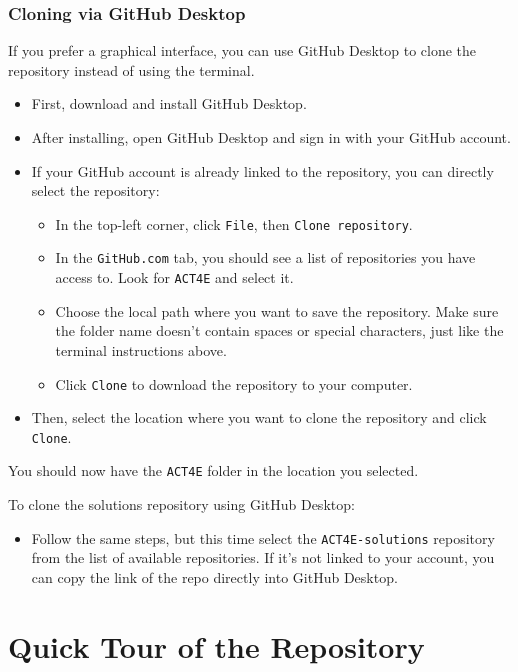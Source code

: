 \documentclass{article}
\begin{document}
\subsubsection{Cloning via GitHub Desktop}
If you prefer a graphical interface, you can use GitHub Desktop to clone the repository instead of using the terminal. 
\begin{itemize} 
\item First, download and install GitHub Desktop. 
\item After installing, open GitHub Desktop and sign in with your GitHub account. 
\item If your GitHub account is already linked to the repository, you can directly select the repository: \begin{itemize} 
\item In the top-left corner, click \texttt{File}, then \texttt{Clone repository}. 
\item In the \texttt{GitHub.com} tab, you should see a list of repositories you have access to. Look for \texttt{ACT4E} and select it. 
\item Choose the local path where you want to save the repository. Make sure the folder name doesn't contain spaces or special characters, just like the terminal instructions above. 
\item Click \texttt{Clone} to download the repository to your computer. \end{itemize} 
\item Then, select the location where you want to clone the repository and click \texttt{Clone}. 
\end{itemize}

You should now have the \texttt{ACT4E} folder in the location you selected.

To clone the solutions repository using GitHub Desktop: 
\begin{itemize} 
\item Follow the same steps, but this time select the \texttt{ACT4E-solutions} repository from the list of available repositories. If it’s not linked to your account, you can copy the link of the repo directly into GitHub Desktop.
\end{itemize}

\section{Quick Tour of the Repository}
\end{document}
